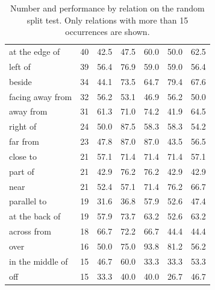 \begin{table}[ht]
\begin{tabular}{lrrrrrr}
at the edge of       &      40 &        42.5 &    47.5 &  60.0 &        50.0 &        62.5 \\
left of              &      39 &        56.4 &    76.9 &  59.0 &        59.0 &        56.4 \\
beside               &      34 &        44.1 &    73.5 &  64.7 &        79.4 &        67.6 \\
facing away from     &      32 &        56.2 &    53.1 &  46.9 &        56.2 &        50.0 \\
away from            &      31 &        61.3 &    71.0 &  74.2 &        41.9 &        64.5 \\
right of             &      24 &        50.0 &    87.5 &  58.3 &        58.3 &        54.2 \\
far from             &      23 &        47.8 &    87.0 &  87.0 &        43.5 &        56.5 \\
close to             &      21 &        57.1 &    71.4 &  71.4 &        71.4 &        57.1 \\
part of              &      21 &        42.9 &    76.2 &  76.2 &        42.9 &        42.9 \\
near                 &      21 &        52.4 &    57.1 &  71.4 &        76.2 &        66.7 \\
parallel to          &      19 &        31.6 &    36.8 &  57.9 &        52.6 &        47.4 \\
at the back of       &      19 &        57.9 &    73.7 &  63.2 &        52.6 &        63.2 \\
across from          &      18 &        66.7 &    72.2 &  66.7 &        44.4 &        44.4 \\
over                 &      16 &        50.0 &    75.0 &  93.8 &        81.2 &        56.2 \\
in the middle of     &      15 &        46.7 &    60.0 &  33.3 &        33.3 &        53.3 \\
off                  &      15 &        33.3 &    40.0 &  40.0 &        26.7 &        46.7 \\
\bottomrule
\end{tabular}
\caption{Number and performance by relation on the random split test. Only relations with more than 15 occurrences are shown.}
\label{tab:results-by-relation-random}
\end{table}

